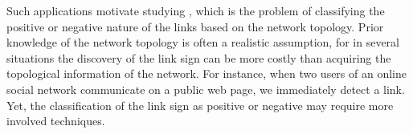 

\bigskip

Such applications motivate studying \esp{}, which is the problem of classifying the positive or
negative nature of the links based on the
network topology. Prior knowledge of the network topology is often a realistic assumption, for in
several situations the discovery of the link sign can be more costly than acquiring the topological
information of the network. For instance, when two users of an online social network communicate on
a public web page, we immediately detect a link. Yet, the classification of the link sign as
positive or negative may require more involved techniques.

